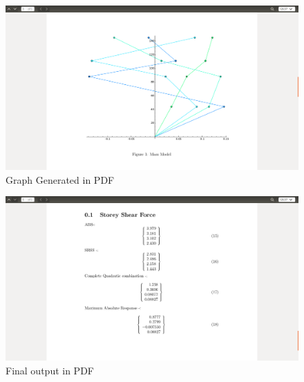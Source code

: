 \newpage
\begin{figure}[H]
\centering \includegraphics[scale=0.31]{images/output/8.png}
\caption{Graph Generated in PDF}
\end{figure}
\begin{figure}[H]
\centering \includegraphics[scale=0.31]{images/output/9.png}
\caption{Final output in PDF}
\end{figure}
\newpage
